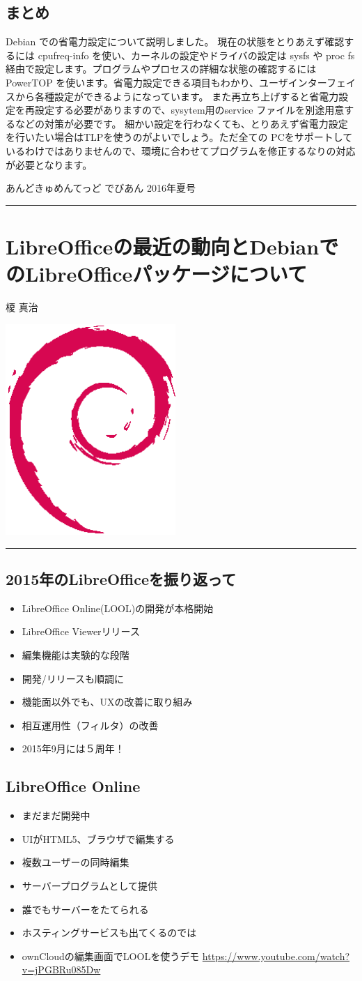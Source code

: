 \documentclass[mingoth,a4paper]{jsarticle}
\renewcommand{\dancersection}[2]{%
\newpage
あんどきゅめんてっど でびあん 2016年夏号
%
\vspace{0.1mm}\\
{\color{dancerdarkblue}\rule{\hsize}{2mm}}

%
%
\begin{minipage}[t]{0.6\hsize}
\color{dancerdarkblue}
\vspace{1cm}
\section{#1}
\hfill{}#2\\
\end{minipage}
\begin{minipage}[t]{0.4\hsize}
\vspace{-2cm}
\hfill{}\includegraphics[height=8cm]{image200502/openlogo-nd.eps}\\
\vspace{-5cm}
\end{minipage}
%
{\color{dancerlightblue}\rule{0.66\hsize}{2mm}}
%
\vspace{2cm}
}
\begin{document}
\subsection{まとめ}

Debian での省電力設定について説明しました。
現在の状態をとりあえず確認するには cpufreq-info を使い、カーネルの設定やドライバの設定は
sysfs や proc fs 経由で設定します。プログラムやプロセスの詳細な状態の確認するには PowerTOP
を使います。省電力設定できる項目もわかり、ユーザインターフェイスから各種設定ができるようになっています。
また再立ち上げすると省電力設定を再設定する必要がありますので、sysytem用のservice
ファイルを別途用意するなどの対策が必要です。
細かい設定を行わなくても、とりあえず省電力設定を行いたい場合はTLPを使うのがよいでしょう。ただ全ての
PCをサポートしているわけではありませんので、環境に合わせてプログラムを修正するなりの対応が必要となります。

\dancersection{LibreOfficeの最近の動向とDebianでのLibreOfficeパッケージについて}{榎 真治}

\subsection{2015年のLibreOfficeを振り返って}
\begin{itemize}
\item %
LibreOffice Online(LOOL)の開発が本格開始
\item %
LibreOffice Viewerリリース
\item %
編集機能は実験的な段階
\item %
開発/リリースも順調に
\item %
機能面以外でも、UXの改善に取り組み
\item %
相互運用性（フィルタ）の改善
\item %
2015年9月には５周年！
\end{itemize}

\subsection{LibreOffice Online}
\begin{itemize}
\item %
まだまだ開発中
\item %
UIがHTML5、ブラウザで編集する
\item %
複数ユーザーの同時編集
\item %
サーバープログラムとして提供
\item %
誰でもサーバーをたてられる
\item %
ホスティングサービスも出てくるのでは
\item ownCloudの編集画面でLOOLを使うデモ
\url{https://www.youtube.com/watch?v=jPGBRu085Dw}
\end{itemize}
\end{document}
